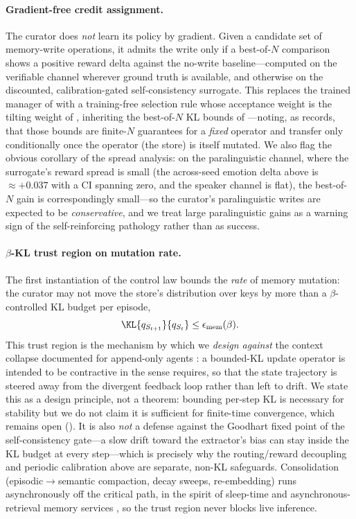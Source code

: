 \paragraph{Gradient-free credit assignment.} The curator does \emph{not} learn its policy by gradient. Given a candidate set of memory-write operations, it admits the write only if a best-of-$N$ comparison shows a positive reward delta against the no-write baseline---computed on the verifiable channel wherever ground truth is available, and otherwise on the discounted, calibration-gated self-consistency surrogate. This replaces the trained manager of \citet{memoryr1_2025} with a training-free selection rule whose acceptance weight is the tilting weight of , inheriting the best-of-$N$ KL bounds of \citet{beirami2024bon,verdun2025softbon}---noting, as  records, that those bounds are finite-$N$ guarantees for a \emph{fixed} operator and transfer only conditionally once the operator (the store) is itself mutated. We also flag the obvious corollary of the spread analysis: on the paralinguistic channel, where the surrogate's reward spread is small (the across-seed emotion delta above is $\approx +0.037$ with a CI spanning zero, and the speaker channel is flat), the best-of-$N$ gain is correspondingly small---so the curator's paralinguistic writes are expected to be \emph{conservative}, and we treat large paralinguistic gains as a warning sign of the self-reinforcing pathology rather than as success.

\paragraph{$\beta$-KL trust region on mutation rate.} The first instantiation of the control law bounds the \emph{rate} of memory mutation: the curator may not move the store's distribution over keys by more than a $\beta$-controlled KL budget per episode,
\[
\KL{q_{S_{t+1}}}{q_{S_t}} \le \epsilon_{\mathrm{mem}}(\beta).
\]
This trust region is the mechanism by which we \emph{design against} the context collapse documented for append-only agents \citep{ace2025,expfollowing2025}: a bounded-KL update operator is intended to be contractive in the sense  requires, so that the state trajectory is steered away from the divergent feedback loop rather than left to drift. We state this as a design principle, not a theorem: bounding per-step KL is necessary for stability but we do not claim it is sufficient for finite-time convergence, which remains open (). It is also \emph{not} a defense against the Goodhart fixed point of the self-consistency gate---a slow drift toward the extractor's bias can stay inside the KL budget at every step---which is precisely why the routing/reward decoupling and periodic calibration above are separate, non-KL safeguards. Consolidation (episodic$\to$semantic compaction, decay sweeps, re-embedding) runs asynchronously off the critical path, in the spirit of sleep-time and asynchronous-retrieval memory services \citep{lettasleeptime,moshirag2026}, so the trust region never blocks live inference.

